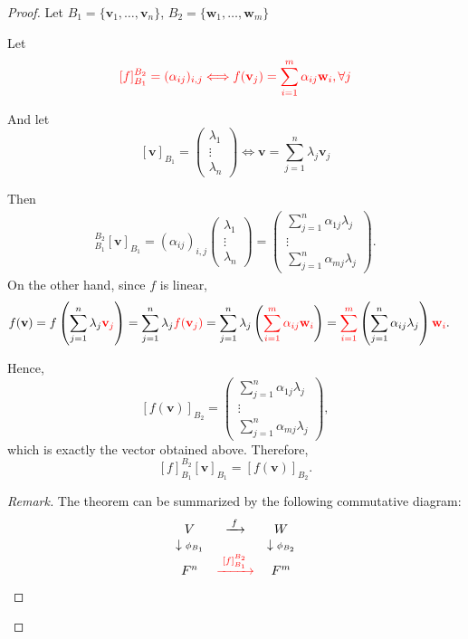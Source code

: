 \documentclass[12pt]{article}
\newenvironment{Remark}
{\begin{proof}[Remark]}
{\end{proof}}
\begin{document}
\begin{proof}
Let $B_1=\{\mathbf{v}_1,\ldots,\mathbf{v}_n\}$, $B_2=\{\mathbf{w}_1,\ldots,\mathbf{w}_m\}$

Let
\[
\textcolor{red}{[f]_{B_1}^{B_2}=(\alpha_{ij})_{i,j} \Longleftrightarrow f(\mathbf{v}_j)=\sum_{i=1}^{m}\alpha_{ij}\mathbf{w}_i,\forall j}
\]

And let
\[
[\mathbf{v}]_{B_1}=
\begin{pmatrix}
\lambda_1\\
\vdots\\
\lambda_n
\end{pmatrix} \Longleftrightarrow \mathbf{v}=\sum_{j=1}^{n}\lambda_j\mathbf{v}_j
\]

Then
\begin{align*}
[f]_{B_1}^{B_2}[\mathbf{v}]_{B_1}
=
(\alpha_{ij})_{i,j}
\begin{pmatrix}
\lambda_1\\
\vdots\\
\lambda_n
\end{pmatrix} 
=
\begin{pmatrix}
\sum_{j=1}^{n}\alpha_{1j}\lambda_j\\
\vdots\\
\sum_{j=1}^{n}\alpha_{mj}\lambda_j
\end{pmatrix}.
\end{align*}
On the other hand, since $f$ is linear,
\begin{align*}
f(\mathbf{v})
&=
f\left(
\sum_{j=1}^{n}\lambda_j\textcolor{red}{\mathbf{v}_j}
\right)                                              
=
\sum_{j=1}^{n}\lambda_j\textcolor{red}{f(\mathbf{v}_j)}            
=
\sum_{j=1}^{n}\lambda_j
\left(
\textcolor{red}{\sum_{i=1}^{m}\alpha_{ij}\mathbf{w}_i}
\right)                              
=
\textcolor{red}{\sum_{i=1}^{m}}
\left(
\sum_{j=1}^{n}\alpha_{ij}\lambda_j
\right)
\textcolor{red}{\mathbf{w}_i}.
\end{align*}

Hence,
\[
[f(\mathbf{v})]_{B_2}=
\begin{pmatrix}
\sum_{j=1}^{n}\alpha_{1j}\lambda_j\\
\vdots\\
\sum_{j=1}^{n}\alpha_{mj}\lambda_j
\end{pmatrix},
\]
which is exactly the vector obtained above. Therefore,
\[
[f]_{B_1}^{B_2}[\mathbf{v}]_{B_1}=[f(\mathbf{v})]_{B_2}.
\]

\begin{Remark}
The theorem can be summarized by the following commutative diagram:
\[
\begin{array}{ccc}
V & \xrightarrow{\;f\;} & W\\
\downarrow{\scriptstyle\phi_{B_1}} && \downarrow{\scriptstyle\phi_{B_2}}\\
F^n & \textcolor{red}{\xrightarrow{\;[f]_{B_1}^{B_2}\;}} & F^m
\end{array}
\]


\end{Remark}
\end{proof}
\end{document}
